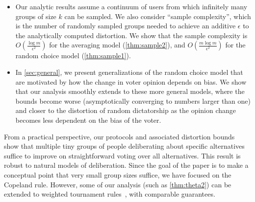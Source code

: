 \begin{itemize}
\item Our analytic results assume a continuum of users from which infinitely many groups of size $k$ can be sampled. We also consider ``sample complexity'', which is the number of randomly sampled groups needed to achieve an additive $\epsilon$ to the analytically computed distortion. We show that the sample complexity is $O\left(\frac{\log m}{\epsilon^2}\right)$ for the averaging model (\cref{thm:sample2}), and $O\left(\frac{m \log m}{\epsilon^2}\right)$ for the random choice model (\cref{thm:sample1}). 
\item In \cref{sec:general}, we present generalizations of the random choice model that are motivated by how the change in voter opinion depends on bias. We show that our analysis smoothly extends to these more general models, where the bounds become worse (asymptotically converging to numbers larger than one) and closer to the distortion of random dictatorship as the opinion change becomes less dependent on the bias of the voter.
\end{itemize}


From a practical perspective, our protocols and associated distortion bounds show that multiple tiny groups of people deliberating about specific alternatives suffice to improve on straightforward voting over all alternatives. This result is robust to natural models of deliberation. Since the goal of the paper is to make a conceptual point that very small group sizes suffice, we have focused on the Copeland rule. However, some of our analysis (such as \cref{thm:theta2}) can be extended to weighted tournament rules~\cite{MunagalaW19,Kempe_2020}, with comparable guarantees. 



